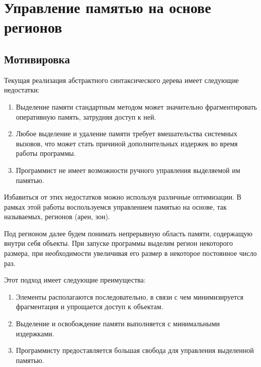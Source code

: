 \documentclass[referat]{SCWorks}
\begin{document}
\tableofcontents

\section{Управление памятью на основе регионов}
\subsection{Мотивировка}
Текущая реализация абстрактного синтаксического дерева имеет следующие недостатки:
\begin{enumerate}
    \item Выделение памяти стандартным методом может значительно фрагментировать оперативную память, затрудняя доступ к ней.
    \item Любое выделение и удаление памяти требует вмешательства системных
    вызовов, что может стать причиной дополнительных издержек во время работы программы.
    \item Программист не имеет возможности ручного управления выделяемой им памятью.
\end{enumerate}

Избавиться от этих недостатков можно используя различные оптимизации. В рамках этой работы воспользуемся управлением памятью на основе, так называемых, регионов (арен, зон)\cite{Princeton}.

Под регионом далее будем понимать непрерывную область памяти, содержащую внутри себя объекты. При запуске программы выделим регион некоторого размера, при необходимости увеличивая его размер в некоторое постоянное
число раз.

Этот подход имеет следующие преимущества:
\begin{enumerate}
    \item Элементы располагаются последовательно, в связи с чем минимизируется фрагментация и упрощается доступ к объектам.
    \item Выделение и освобождение памяти выполняется с минимальными издержками.
    \item Программисту предоставляется большая свобода для управления выделенной памятью.
\end{enumerate}
\end{document}
